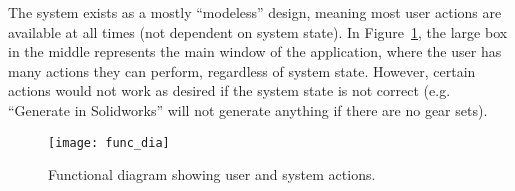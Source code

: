 \begin{doublespace}
The system exists as a mostly ``modeless'' design, meaning most user actions are available at all times (not dependent on system state). In Figure~\ref{fig:func_dia}, the large box in the middle represents the main window of the application, where the user has many actions they can perform, regardless of system state. However, certain actions would not work as desired if the system state is not correct (e.g. ``Generate in Solidworks'' will not generate anything if there are no gear sets). 

\begin{figure}[htbp]
    \centering
    \texttt{[image: func\_dia]}
    \caption{Functional diagram showing user and system actions.}
    \label{fig:func_dia}
\end{figure}

\end{doublespace}